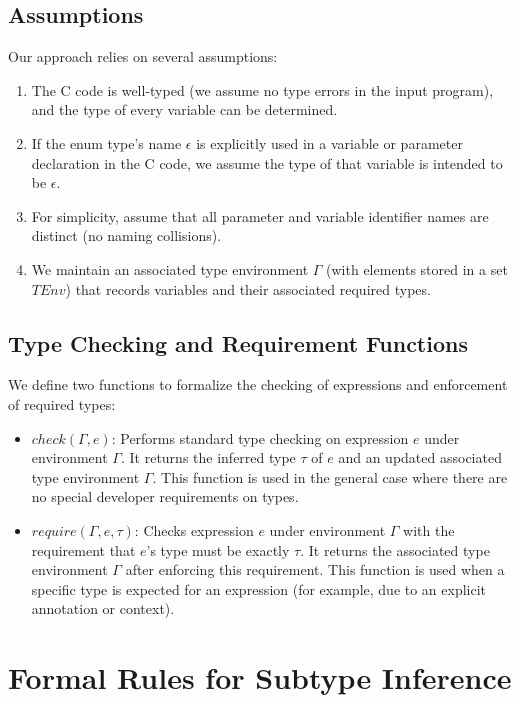 \documentclass[peerreview, 10pt]{IEEEtran}
\begin{document}
\subsection{Assumptions}
Our approach relies on several assumptions:
\begin{enumerate}
    \item The C code is well-typed (we assume no type errors in the input program), and the type of every variable can be determined.
    \item If the enum type's name $\epsilon$ is explicitly used in a variable or parameter declaration in the C code, we assume the type of that variable is intended to be $\epsilon$.
    \item For simplicity, assume that all parameter and variable identifier names are distinct (no naming collisions).
    \item We maintain an associated type environment $\Gamma$ (with elements stored in a set $TEnv$) that records variables and their associated required types.
\end{enumerate}

\subsection{Type Checking and Requirement Functions}
We define two functions to formalize the checking of expressions and enforcement of required types:
\begin{itemize}
    \item $check(\Gamma, e)$: Performs standard type checking on expression $e$ under environment $\Gamma$. It returns the inferred type $\tau$ of $e$ and an updated associated type environment $\Gamma$. This function is used in the general case where there are no special developer requirements on types.
    \item $require(\Gamma, e, \tau)$: Checks expression $e$ under environment $\Gamma$ with the requirement that $e$'s type must be exactly $\tau$. It returns the associated type environment $\Gamma$ after enforcing this requirement. This function is used when a specific type is expected for an expression (for example, due to an explicit annotation or context).
\end{itemize}

\section{Formal Rules for Subtype Inference}
\end{document}
